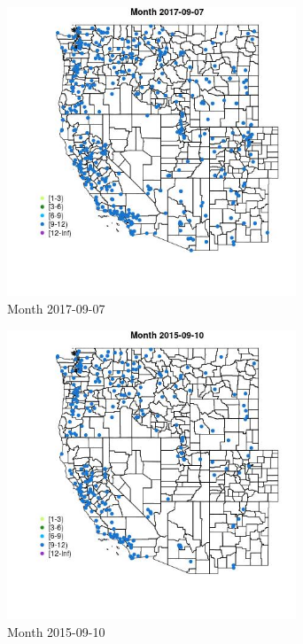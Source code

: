 \begin{figure} 
\centering  
\includegraphics[width=0.77\textwidth]{Code_Outputs/Report_ML_input_PM25_Step4_part_e_de_duplicated_aveswNAs_MapObsMonth2017-09-07.jpg} 
\caption{\label{fig:Report_ML_input_PM25_Step4_part_e_de_duplicated_aveswNAsMapObsMonth2017-09-07}Month 2017-09-07} 
\end{figure} 
 

\begin{figure} 
\centering  
\includegraphics[width=0.77\textwidth]{Code_Outputs/Report_ML_input_PM25_Step4_part_e_de_duplicated_aveswNAs_MapObsMonth2015-09-10.jpg} 
\caption{\label{fig:Report_ML_input_PM25_Step4_part_e_de_duplicated_aveswNAsMapObsMonth2015-09-10}Month 2015-09-10} 
\end{figure} 
 

